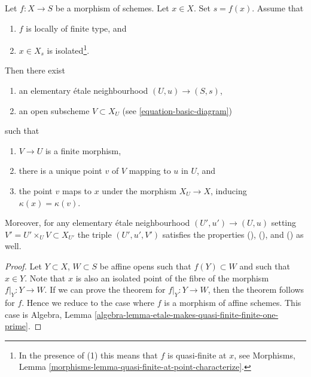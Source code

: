 \begin{lemma}
\label{lemma-etale-makes-quasi-finite-finite-at-point}
Let $f : X \to S$ be a morphism of schemes.
Let $x \in X$. Set $s = f(x)$.
Assume that
\begin{enumerate}
\item $f$ is locally of finite type, and
\item $x \in X_s$ is isolated\footnote{In the presence of (1)
this means that $f$ is
quasi-finite at $x$, see
Morphisms, Lemma \ref{morphisms-lemma-quasi-finite-at-point-characterize}.}.
\end{enumerate}
Then there exist
\begin{enumerate}
\item[(a)] an elementary \'etale neighbourhood $(U, u) \to (S, s)$,
\item[(b)] an open subscheme $V \subset X_U$
(see \ref{equation-basic-diagram})
\end{enumerate}
such that
\begin{enumerate}
\item[(\romannumeral1)] $V \to U$ is a finite morphism,
\item[(\romannumeral2)] there is a unique point $v$ of $V$
mapping to $u$ in $U$, and
\item[(\romannumeral3)] the point $v$ maps to $x$
under the morphism $X_U \to X$, inducing $\kappa(x) = \kappa(v)$.
\end{enumerate}
Moreover, for any elementary \'etale neighbourhood $(U', u') \to (U, u)$
setting $V' = U' \times_U V \subset X_{U'}$ the triple $(U', u', V')$
satisfies the properties
(), (), and () as well.
\end{lemma}

\begin{proof}
Let $Y \subset X$, $W \subset S$ be affine opens such that
$f(Y) \subset W$ and such that $x \in Y$. Note that $x$ is
also an isolated point of the fibre of the morphism $f|_Y : Y \to W$.
If we can prove the theorem for $f|_Y : Y \to W$, then the
theorem follows for $f$. Hence we reduce to the case where
$f$ is a morphism of affine schemes. This case is
Algebra, Lemma \ref{algebra-lemma-etale-makes-quasi-finite-finite-one-prime}.
\end{proof}
